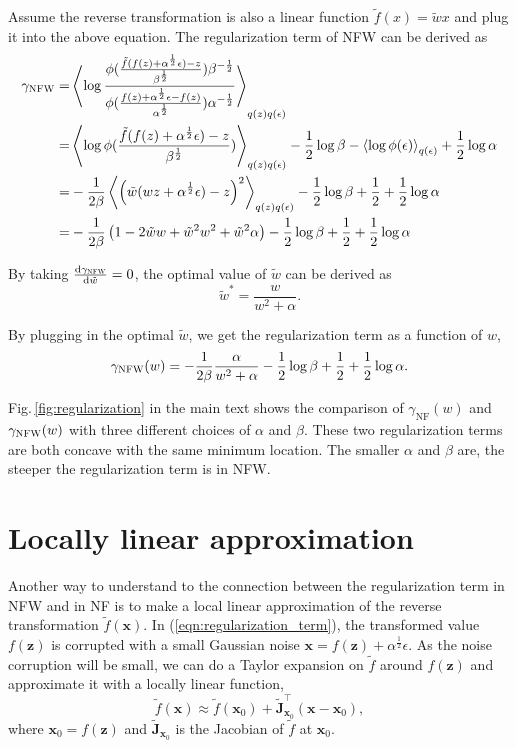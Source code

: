 \documentclass[twoside]{article}
\newcommand{\xV}{\mathbf{x}}
\newcommand{\zV}{\mathbf{z}}
\newcommand{\expectationDist}[2]{\left\langle #1 \right\rangle _{#2}}
\newcommand{\diff}{\text{d}}
\newcommand{\J}{\mathbf{J}}
\newcommand{\acr}[1]{\textsc{#1}\xspace}
\newcommand{\us}{\acr{NFW}}
\begin{document}
Assume the reverse transformation is also a linear function $\tilde{f}(x) = \tilde{w}x$ and plug it into the above equation. The regularization term of \us can be derived as 
\begin{align*}
\gamma_{\text{\us}} =& \expectationDist{\log \frac{\phi(\frac{\tilde{f}(f(z) + \alpha^{\frac{1}{2}} \epsilon) - z}{\beta^{\frac{1}{2}}})\beta^{-\frac{1}{2}}}{\phi(\frac{f(z) + \alpha^{\frac{1}{2}} \epsilon - f(z)}{\alpha^{\frac{1}{2}}}) \alpha^{-\frac{1}{2}}}}{q(z) q(\epsilon)} \\
=& \expectationDist{\log\phi(\frac{\tilde{f}(f(z) + \alpha^{\frac{1}{2}} \epsilon) - z}{\beta^{\frac{1}{2}}})}{q(z) q(\epsilon)} - \frac{1}{2}\log \beta - \expectationDist{\log \phi(\epsilon)}{q(\epsilon)} + \frac{1}{2}\log \alpha \\
=& -\frac{1}{2\beta}\expectationDist{\left(\tilde{w}(wz + \alpha^{\frac{1}{2}} \epsilon) - z\right)^2}{q(z) q(\epsilon)} - \frac{1}{2}\log \beta +\frac{1}{2} + \frac{1}{2}\log \alpha \\
=& -\frac{1}{2\beta}\left(1 - 2\tilde{w}w  + \tilde{w}^2w^2+\tilde{w}^2\alpha\right) - \frac{1}{2}\log \beta +\frac{1}{2} + \frac{1}{2}\log \alpha
\end{align*}

By taking $\frac{\diff \gamma_{\text{\us}}}{\diff \tilde{w}}=0$, the optimal value of $\tilde{w}$ can be derived as 
$$
\tilde{w}^* = \frac{w}{w^2+\alpha}.
$$

By plugging in the optimal $\tilde{w}$, we get the regularization term as a function of $w$,
$$
\gamma_{\text{\us}}(w)  = -\frac{1}{2\beta}\frac{\alpha}{w^2+\alpha} - \frac{1}{2}\log \beta +\frac{1}{2} + \frac{1}{2}\log \alpha.
$$

Fig.\,\ref{fig:regularization} in the main text shows the comparison of $\gamma_{\text{NF}}(w)$ and $\gamma_{\text{\us}}(w)$ with three different choices of $\alpha$ and $\beta$. These two regularization terms are both concave with the same minimum location. The smaller $\alpha$ and $\beta$ are, the steeper the regularization term is in \us. 

\section{Locally linear approximation}

Another way to understand to the connection between the regularization term in \us and in NF is to make a local linear approximation of the reverse transformation $\tilde{f}(\xV)$. In (\ref{eqn:regularization_term}), the transformed value $f(\zV)$ is corrupted with a small Gaussian noise $\xV = f(\zV) + \alpha^{\frac{1}{2}} \epsilon$. As the noise corruption will be small, we can do a Taylor expansion on $\tilde{f}$ around $f(\zV)$ and approximate it with a locally linear function,
$$
\tilde{f}(\xV) \approx \tilde{f}(\xV_0) +  \tilde{\J}_{\xV_0}^\top(\xV - \xV_0),
$$
where $\xV_0 = f(\zV)$ and $ \tilde{\J}_{\xV_0}$ is the Jacobian of $\tilde{f}$ at $\xV_0$. 
\end{document}
